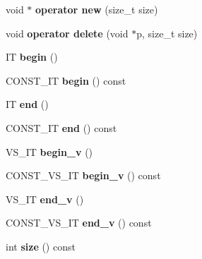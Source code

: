 \begin{CompactItemize}
\item 
void $\ast$ \textbf{operator new} (size\_\-t size)\label{classvat_3_01GRAPH__PROP_00_01V__Fk1__MINE__PROP_00_01ALLOC_00_01ST_01_4_3de081ad2af38cf37b6468f424e08033}

\item 
void \textbf{operator delete} (void $\ast$p, size\_\-t size)\label{classvat_3_01GRAPH__PROP_00_01V__Fk1__MINE__PROP_00_01ALLOC_00_01ST_01_4_b087e2541e5976d7bfe4dddcfdfdcc2b}

\item 
IT \textbf{begin} ()\label{classvat_3_01GRAPH__PROP_00_01V__Fk1__MINE__PROP_00_01ALLOC_00_01ST_01_4_db2545a0ad047574652a385f4a08dadc}

\item 
CONST\_\-IT \textbf{begin} () const \label{classvat_3_01GRAPH__PROP_00_01V__Fk1__MINE__PROP_00_01ALLOC_00_01ST_01_4_fdb812087beb7a663dda17c0b2c6cfb1}

\item 
IT \textbf{end} ()\label{classvat_3_01GRAPH__PROP_00_01V__Fk1__MINE__PROP_00_01ALLOC_00_01ST_01_4_e1dd5b827ca87bbe87c5b8e661e633d4}

\item 
CONST\_\-IT \textbf{end} () const \label{classvat_3_01GRAPH__PROP_00_01V__Fk1__MINE__PROP_00_01ALLOC_00_01ST_01_4_ef863217480f739b8cb06b7ce486de1d}

\item 
VS\_\-IT \textbf{begin\_\-v} ()\label{classvat_3_01GRAPH__PROP_00_01V__Fk1__MINE__PROP_00_01ALLOC_00_01ST_01_4_cbdcbe775f06c90acc48b25a36f2f70e}

\item 
CONST\_\-VS\_\-IT \textbf{begin\_\-v} () const \label{classvat_3_01GRAPH__PROP_00_01V__Fk1__MINE__PROP_00_01ALLOC_00_01ST_01_4_8ca31e6b6247459d6c3d3ec16f3a3084}

\item 
VS\_\-IT \textbf{end\_\-v} ()\label{classvat_3_01GRAPH__PROP_00_01V__Fk1__MINE__PROP_00_01ALLOC_00_01ST_01_4_e6771d98853e8d895122931e36763dd3}

\item 
CONST\_\-VS\_\-IT \textbf{end\_\-v} () const \label{classvat_3_01GRAPH__PROP_00_01V__Fk1__MINE__PROP_00_01ALLOC_00_01ST_01_4_acad995e980fc41f6958d44afb3d6f93}

\item 
int \textbf{size} () const \label{classvat_3_01GRAPH__PROP_00_01V__Fk1__MINE__PROP_00_01ALLOC_00_01ST_01_4_3e550143b5e64bca4d8f89aa5778e097}


\end{CompactItemize}

